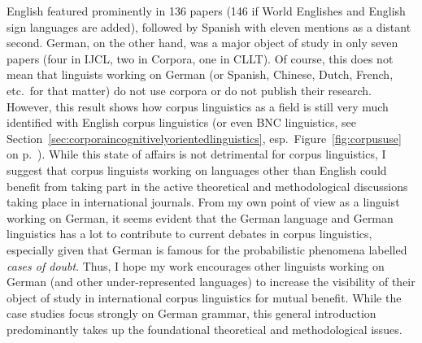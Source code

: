 \documentclass[a4paper, biblatex, charis, linguex]{glossa}
\begin{document}
English featured prominently in 136 papers (146 if World Englishes and English sign languages are added), followed by Spanish with eleven mentions as a distant second.
German, on the other hand, was a major object of study in only seven papers (four in IJCL, two in Corpora, one in CLLT).
Of course, this does not mean that linguists working on German (or Spanish, Chinese, Dutch, French, etc.\ for that matter) do not use corpora or do not publish their research.
However, this result shows how corpus linguistics as a field is still very much identified with English corpus linguistics (or even BNC linguistics, see Section~\ref{sec:corporaincognitivelyorientedlinguistics}, esp.\ Figure~\ref{fig:corpususe} on p.~\pageref{fig:corpususe}).
While this state of affairs is not detrimental for corpus linguistics, I suggest that corpus linguists working on languages other than English could benefit from taking part in the active theoretical and methodological discussions taking place in international journals.
From my own point of view as a linguist working on German, it seems evident that the German language and German linguistics has a lot to contribute to current debates in corpus linguistics, especially given that German is famous for the probabilistic phenomena labelled \textit{cases of doubt}.
Thus, I hope my work encourages other linguists working on German (and other under-represented languages) to increase the visibility of their object of study in international corpus linguistics for mutual benefit.
While the case studies focus strongly on German grammar, this general introduction predominantly takes up the foundational theoretical and methodological issues.

\newpage



\newpage



\newpage



\newpage



\newpage

\printbibliography
\end{document}
